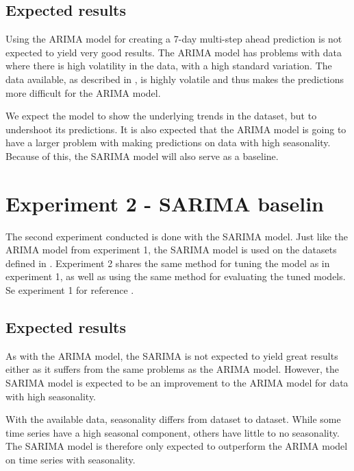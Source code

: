   \subsection{Expected results}

  Using the ARIMA model for creating a 7-day multi-step ahead prediction is not expected to yield very good results.
  The ARIMA model has problems with data where there is high volatility in the data, with a high standard variation.
  The data available, as described in ,
  is highly volatile and thus makes the predictions more difficult for the ARIMA model.

  We expect the model to show the underlying trends in the dataset, but to
  undershoot its predictions.
  It is also expected that the ARIMA model is going to have a larger problem with making predictions on data with high seasonality.
  Because of this, the SARIMA model will also serve as a baseline.


  \section{Experiment 2 - SARIMA baselin}
  \label{section:Method:Experiment2}

  The second experiment conducted is done with the SARIMA model.
  Just like the ARIMA model from experiment 1, the SARIMA model is used on the datasets defined in .
  Experiment 2 shares the same method for tuning the model as in experiment 1,
  as well as using the same method for evaluating the tuned models.
  Se experiment 1 for reference .

  \subsection{Expected results}
  As with the ARIMA model, the SARIMA is not expected to yield great results either as it suffers from the same problems as the ARIMA model.
  However, the SARIMA model is expected to be an improvement to the ARIMA model for data with high seasonality.

  With the available data, seasonality differs from dataset to dataset. While some time series have a high seasonal component,
  others have little to no seasonality.
  The SARIMA model is therefore only expected to outperform the ARIMA model on time series with seasonality.

\fi